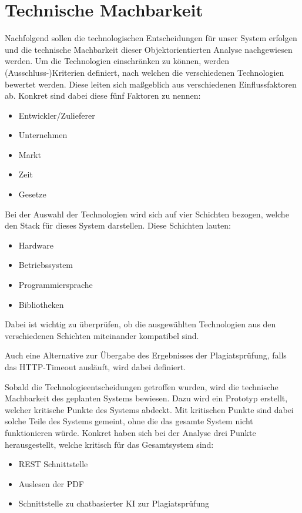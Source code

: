 \chapter{Technische Machbarkeit}\label{ch:technische-machbarkeit}
Nachfolgend sollen die technologischen Entscheidungen für unser System erfolgen
und die technische Machbarkeit dieser Objektorientierten Analyse nachgewiesen werden.
Um die Technologien einschränken zu können, werden (Ausschluss-)Kriterien definiert,
nach welchen die verschiedenen Technologien bewertet werden.
Diese leiten sich maßgeblich aus verschiedenen Einflussfaktoren ab.
Konkret sind dabei diese fünf Faktoren zu nennen:

\begin{itemize}
    \item Entwickler/Zulieferer
    \item Unternehmen
    \item Markt
    \item Zeit
    \item Gesetze
\end{itemize}

Bei der Auswahl der Technologien wird sich auf vier Schichten bezogen,
welche den Stack für dieses System darstellen.
Diese Schichten lauten:
\begin{itemize}
    \item Hardware
    \item Betriebssystem
    \item Programmiersprache
    \item Bibliotheken
\end{itemize}
Dabei ist wichtig zu überprüfen, ob die ausgewählten Technologien
aus den verschiedenen Schichten miteinander kompatibel sind.

Auch eine Alternative zur Übergabe des Ergebnisses der Plagiatsprüfung,
falls das HTTP-Timeout ausläuft, wird dabei definiert.

Sobald die Technologieentscheidungen getroffen wurden,
wird die technische Machbarkeit des geplanten Systems bewiesen.
Dazu wird ein Prototyp erstellt, welcher kritische Punkte des Systems abdeckt.
Mit kritischen Punkte sind dabei solche Teile des Systems gemeint,
ohne die das gesamte System nicht funktionieren würde.
Konkret haben sich bei der Analyse drei Punkte herausgestellt,
welche kritisch für das Gesamtsystem sind:
\begin{itemize}
    \item REST Schnittstelle
    \item Auslesen der PDF
    \item Schnittstelle zu chatbasierter KI zur Plagiatsprüfung
\end{itemize}


